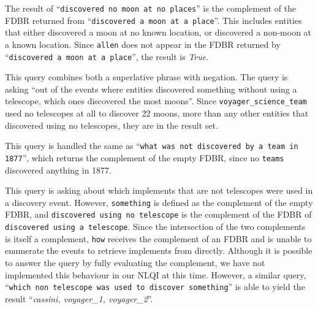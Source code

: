 \documentclass[../main.tex]{subfiles}
\begin{document}
\begin{refsection}
\examplespacing


\examplespacing

\noindent The result of ``\texttt{discovered no moon at no places}'' is the complement of the FDBR returned from ``\texttt{discovered a moon at a place}''.  This includes entities that either discovered a moon at no known location, or discovered a non-moon at a known location.  Since \texttt{allen} does not appear in the FDBR returned by ``\texttt{discovered a moon at a place}'', the result is \textit{True}.

\examplespacing


\examplespacing

\noindent This query combines both a superlative phrase with negation.  The query is asking ``out of the events where entities discovered something without using a telescope, which ones discovered the most moons''.  Since \texttt{voyager\_science\_team} used no telescopes at all to discover 22 moons, more than any other entities that discovered using no telescopes, they are in the result set.

\examplespacing


\examplespacing

\noindent This query is handled the same as ``\texttt{what was not discovered by a team in 1877}'', which returns the complement of the empty FDBR, since no \texttt{teams} discovered anything in 1877.

\examplespacing


\examplespacing

\noindent This query is asking about which implements that are not telescopes were used in a discovery event.  However, \texttt{something} is defined as the complement of the empty FDBR, and \texttt{discovered using no telescope} is the complement of the FDBR of \texttt{discovered using a telescope}.  Since the intersection of the two complements is itself a complement, \texttt{how} receives the complement of an FDBR and is unable to enumerate the events to retrieve implements from directly.  Although it is possible to answer the query by fully evaluating the complement, we have not implemented this behaviour in our NLQI at this time.  However, a similar query, ``\texttt{which non telescope was used to discover something}'' is able to yield the result ``\textit{cassini, voyager\_1, voyager\_2}''.


\end{refsection}
\end{document}
